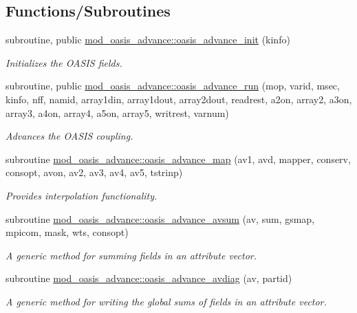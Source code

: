 \subsection*{Functions/\+Subroutines}
\begin{DoxyCompactItemize}
\item 
subroutine, public \hyperlink{namespacemod__oasis__advance_a480bfe5b333300c1084af8f9c239a81d}{mod\+\_\+oasis\+\_\+advance\+::oasis\+\_\+advance\+\_\+init} (kinfo)
\begin{DoxyCompactList}\small\item\em Initializes the O\+A\+S\+IS fields. \end{DoxyCompactList}\item 
subroutine, public \hyperlink{namespacemod__oasis__advance_a932b0cbe5d1f5fa27c283c6472be7baf}{mod\+\_\+oasis\+\_\+advance\+::oasis\+\_\+advance\+\_\+run} (mop, varid, msec, kinfo, nff, namid, array1din, array1dout, array2dout, readrest, a2on, array2, a3on, array3, a4on, array4, a5on, array5, writrest, varnum)
\begin{DoxyCompactList}\small\item\em Advances the O\+A\+S\+IS coupling. \end{DoxyCompactList}\item 
subroutine \hyperlink{namespacemod__oasis__advance_a0514c843d051b8ee16adfb349eaee6a7}{mod\+\_\+oasis\+\_\+advance\+::oasis\+\_\+advance\+\_\+map} (av1, avd, mapper, conserv, consopt, avon, av2, av3, av4, av5, tstrinp)
\begin{DoxyCompactList}\small\item\em Provides interpolation functionality. \end{DoxyCompactList}\item 
subroutine \hyperlink{namespacemod__oasis__advance_acf8f4a02082ba2d9f32f0835ad14e11d}{mod\+\_\+oasis\+\_\+advance\+::oasis\+\_\+advance\+\_\+avsum} (av, sum, gsmap, mpicom, mask, wts, consopt)
\begin{DoxyCompactList}\small\item\em A generic method for summing fields in an attribute vector. \end{DoxyCompactList}\item 
subroutine \hyperlink{namespacemod__oasis__advance_a6faf6ac09dd35d44e62daad5e09d7b24}{mod\+\_\+oasis\+\_\+advance\+::oasis\+\_\+advance\+\_\+avdiag} (av, partid)
\begin{DoxyCompactList}\small\item\em A generic method for writing the global sums of fields in an attribute vector. \end{DoxyCompactList}\end{DoxyCompactItemize}
